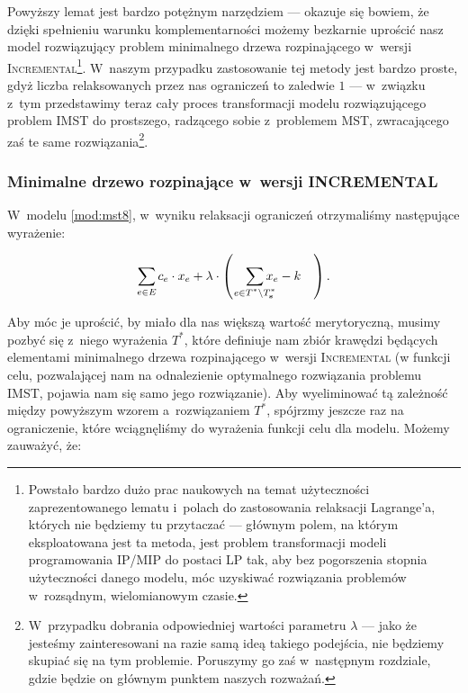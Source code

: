 Powyższy lemat jest bardzo potężnym narzędziem --- okazuje się bowiem, że dzięki spełnieniu warunku komplementarności możemy bezkarnie uprościć nasz model rozwiązujący problem minimalnego drzewa rozpinającego w~wersji \textsc{Incremental}\footnote{
	Powstało bardzo dużo prac naukowych na temat użyteczności zaprezentowanego lematu i~polach do zastosowania relaksacji Lagrange'a, których nie będziemy tu przytaczać --- głównym polem, na którym eksploatowana jest ta metoda, jest problem transformacji modeli programowania \textsc{IP}/\textsc{MIP} do postaci \textsc{LP} tak, aby bez pogorszenia stopnia użyteczności danego modelu, móc uzyskiwać rozwiązania problemów w~rozsądnym, wielomianowym czasie.
}.
W~naszym przypadku zastosowanie tej metody jest bardzo proste, gdyż liczba relaksowanych przez nas ograniczeń to zaledwie $1$ --- w~związku z~tym przedstawimy teraz cały proces transformacji modelu rozwiązującego problem \textsc{IMST} do prostszego, radzącego sobie z~problemem \textsc{MST}, zwracającego zaś te same rozwiązania\footnote{
	W~przypadku dobrania odpowiedniej wartości parametru $\lambda$ --- jako że jesteśmy zainteresowani na razie samą ideą takiego podejścia, nie będziemy skupiać się na tym problemie.
	Poruszymy go zaś w~następnym rozdziale, gdzie będzie on głównym punktem naszych rozważań.
}.


\subsubsection{Minimalne drzewo rozpinające w~wersji INCREMENTAL}


W~modelu \ref{mod:mst8}, w~wyniku relaksacji ograniczeń otrzymaliśmy następujące wyrażenie:

\begin{equation}\label{eq:imstrelax}
	\sum_{\mathclap{e \in E}} c_{e} \cdot x_{e} + \lambda \cdot \left( \quad \sum_{\mathclap{e \in T^{\ast} \setminus T^{\ast}_{\textbf{s}}}} x_{e} - k \quad \right)\text{.}
\end{equation}

Aby móc je uprościć, by miało dla nas większą wartość merytoryczną, musimy pozbyć się z~niego wyrażenia $T^{\ast}$, które definiuje nam zbiór krawędzi będących elementami minimalnego drzewa rozpinającego w~wersji \textsc{Incremental} (w funkcji celu, pozwalającej nam na odnalezienie optymalnego rozwiązania problemu \textsc{IMST}, pojawia nam się samo jego rozwiązanie).
Aby wyeliminować tą zależność między powyższym wzorem a~rozwiązaniem $T^{\ast}$, spójrzmy jeszcze raz na ograniczenie, które wciągnęliśmy do wyrażenia funkcji celu dla modelu.
Możemy zauważyć, że:

